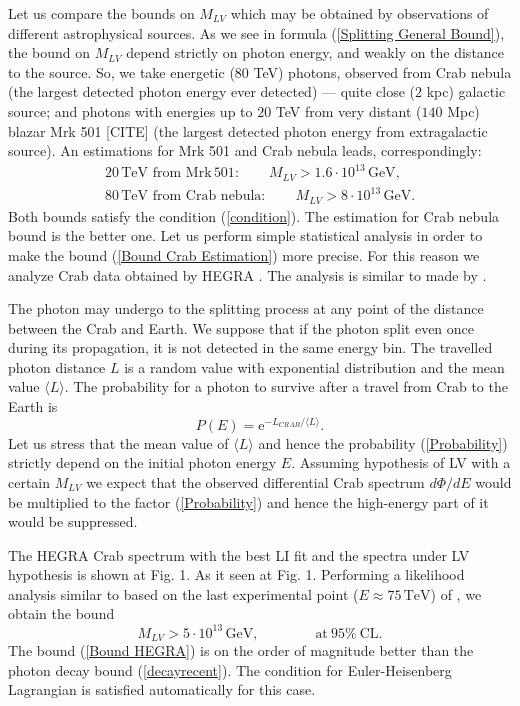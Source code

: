 \documentclass{webofc}
\begin{document}
Let us compare the bounds on $M_{LV}$ which may be obtained by observations of different astrophysical sources. As we see in formula (\ref{Splitting General Bound}), the bound on $M_{LV}$ depend strictly on photon energy, and weakly on the distance to the source. So, we take energetic ($80$ TeV)  photons, observed from Crab nebula \cite{Aharonian:2004gb} (the largest detected photon energy ever detected) --- quite close ($2$ kpc) galactic source; and photons with energies up to $20$ TeV from very distant  ($140$ Mpc) blazar Mrk 501 [CITE] (the largest detected photon energy from extragalactic source).  An estimations for Mrk 501 and Crab nebula leads, correspondingly:
\begin{align}
\label{Bound Mrk 501}
20\, \mbox{TeV from Mrk}\, 501: \qquad  M_{LV} > 1.6 \cdot 10^{13}\,\mbox{GeV},\\
\label{Bound Crab Estimation}
80\, \mbox{TeV from Crab nebula}: \qquad M_{LV} > 8 \cdot 10^{13}\,\mbox{GeV}.
\end{align}
Both bounds satisfy the condition (\ref{condition}). The estimation for Crab nebula bound is the better one. Let us perform simple statistical analysis in order to make the bound (\ref{Bound Crab Estimation}) more precise. For this reason we analyze Crab data obtained by HEGRA \cite{Aharonian:2004gb}. The analysis is similar to made by \cite{Rubtsov:2016bea}.

The photon may undergo to the splitting process at any point of the distance between the Crab and Earth. We suppose that if the photon split even once during its propagation, it is not detected in the same energy bin. The travelled photon distance $L$ is a random value with exponential distribution and the mean value $\langle L \rangle$. The probability for a photon to survive after a travel from Crab to the Earth is
\begin{equation}
\label{Probability}
P(E) = \mbox{e}^{-L_{CRAB}/\langle L \rangle}.
\end{equation}
Let us stress that the mean value of $\langle L \rangle$ and hence the probability (\ref{Probability}) strictly depend on the initial photon energy $E$. Assuming hypothesis of LV with a certain $M_{LV}$ we expect that the observed differential Crab spectrum $d\Phi/dE$ would be multiplied to the factor (\ref{Probability}) and hence the high-energy part of it would be suppressed.

The HEGRA Crab spectrum \cite{Aharonian:2004gb} with the best LI fit and the spectra under LV hypothesis is shown at Fig. 1. As it  seen at Fig. 1. Performing a likelihood analysis similar to \cite{Rubtsov:2016bea} based on the last experimental point ($E\approx 75\,\mbox{TeV}$) of \cite{Aharonian:2004gb}, we obtain the bound
\begin{equation}
\label{Bound HEGRA}
M_{LV} > 5\cdot 10^{13}\,\mbox{GeV}, \qquad\qquad \mbox{at}\ 95\%\ \mbox{CL}.
\end{equation}
The bound (\ref{Bound HEGRA}) is on the order of magnitude better than the photon decay bound (\ref{decayrecent}). The condition for Euler-Heisenberg Lagrangian is satisfied automatically for this case.
\end{document}
